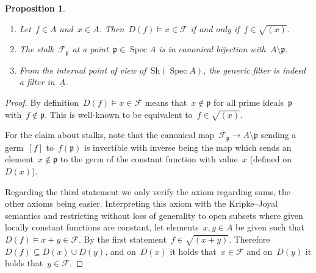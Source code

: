 \documentclass[10pt]{amsart}
\theoremstyle{definition}
\theoremstyle{plain}
\newtheorem{prop}[defn]{Proposition}
\theoremstyle{remark}
\newcommand{\F}{\mathcal{F}}
\newcommand{\ppp}{\mathfrak{p}}
\newcommand{\ul}[1]{\underline{#1}}
\newcommand{\Sh}{\mathrm{Sh}}
\DeclareMathOperator{\Spec}{Spec}
\newcommand{\?}{\,{:}\,}
\renewcommand{\_}{\mathpunct{.}\,}
\begin{document}
\begin{prop}\label{prop:basics-univ-filter}\begin{enumerate}
\item Let~$f \in A$ and~$x \in A$. Then~$D(f) \models x \in \F$ if and only
if~$f \in \sqrt{(x)}$.
\item The stalk~$\F_\ppp$ at a point~$\ppp \in \Spec A$
is in canonical bijection with~$A \setminus \ppp$.
\item From the internal point of view of~$\Sh(\Spec A)$, the generic
filter is indeed a filter in~$\ul{A}$.
\end{enumerate}
\end{prop}
\begin{proof}By definition~$D(f) \models x \in \F$ means that~$x \not\in \ppp$
for all prime ideals~$\ppp$ with~$f \not\in \ppp$. This is well-known to be
equivalent to~$f \in \sqrt{(x)}$.

For the claim about stalks, note that the canonical map~$\F_\ppp \to A
\setminus \ppp$ sending a germ~$[f]$ to~$f(\ppp)$ is invertible with inverse
being the map which sends an element~$x \not\in \ppp$ to the germ of the
constant function with value~$x$ (defined on~$D(x)$).

Regarding the third statement we only verify the axiom regarding sums, the
other axioms being easier. Interpreting this axiom with the Kripke--Joyal
semantics and restricting without loss of generality to open subsets where
given locally constant functions are constant, let elements~$x,y \in A$ be
given such that~$D(f) \models x+y \in \F$. By the first statement~$f \in
\sqrt{(x+y)}$. Therefore~$D(f) \subseteq D(x) \cup D(y)$, and on~$D(x)$ it
holds that~$x \in \F$ and on~$D(y)$ it holds that~$y \in \F$.
\end{proof}
\end{document}
